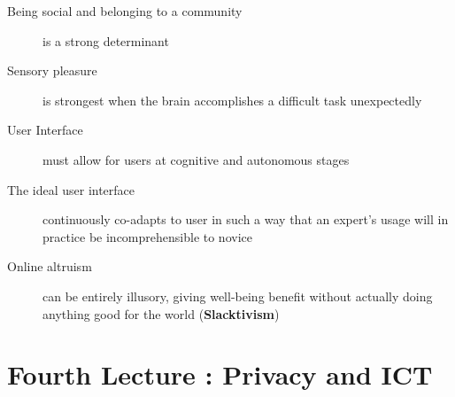 \documentclass[a4paper]{article}
\begin{document}
\begin{description}
\item[Being social and belonging to a community] is a strong determinant
\item[Sensory pleasure] is strongest when the brain accomplishes a difficult task unexpectedly
\item[User Interface] must allow for users at cognitive and autonomous stages
\item[The ideal user interface] continuously co-adapts to user in such a way that an expert's usage will in practice be incomprehensible to novice
\item[Online altruism] can be entirely illusory, giving well-being benefit without actually doing anything good for the world (\textbf{Slacktivism})
\end{description}

\section{Fourth Lecture : Privacy and ICT}
\end{document}
